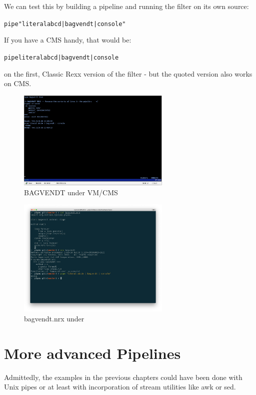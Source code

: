 We can test this by building a pipeline and running the filter on its
own source:
\begin{alltt}
pipe "literal abcd | bagvendt | console"
 \end{alltt}
If you have a CMS handy, that would be:
\begin{alltt}
pipe literal abcd | bagvendt | console
 \end{alltt}
on the first, Classic Rexx version of the filter - but the quoted
version also works on CMS.
\begin{figure}[h]
  \includegraphics[width=0.65\textwidth]{images/vmbagvendt.png}
  \caption{BAGVENDT under VM/CMS}
  \label{fig:vmbagvendt}
\end{figure}\begin{figure}[h]
  \includegraphics[width=0.65\textwidth]{images/nrbagvendt.png}
  \caption{bagvendt.nrx under \nr{}}
  \label{fig:nrbagvendt}
\end{figure}

\chapter{More advanced Pipelines}
Admittedly, the examples in the previous chapters could have been done
with Unix pipes or at least with incorporation of stream utilities
like awk or sed.


